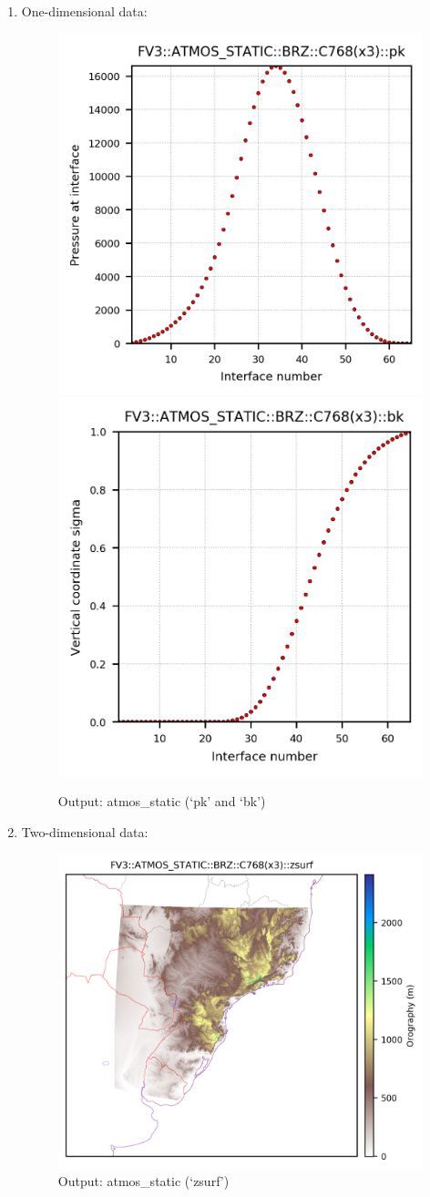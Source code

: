 \documentclass[11pt,fleqn]{report}              %
\begin{document}
\begin{enumerate}
\begin{enumerate}
\item One-dimensional data:
\begin{figure}[ht!]
  \centering
  \includegraphics[width=0.48\linewidth]{fv3_out_atmfix_BRZ_C768_pk.png}
  \includegraphics[width=0.47\linewidth]{fv3_out_atmfix_BRZ_C768_bk.png}  
  \caption{Output: atmos\_static (`pk' and `bk')}
  \label{fig:py_out_atmfix_1d}
\end{figure}

\item Two-dimensional data:
\begin{figure}[ht!]
  \centering
  \includegraphics[width=0.6\linewidth]{fv3_out_atmfix_BRZ_C768_zsurf.png}  
  \caption{Output: atmos\_static (`zsurf')}
  \label{fig:py_out_atmfix_2d}
\end{figure}
\end{enumerate}

\end{enumerate}
\end{document}
